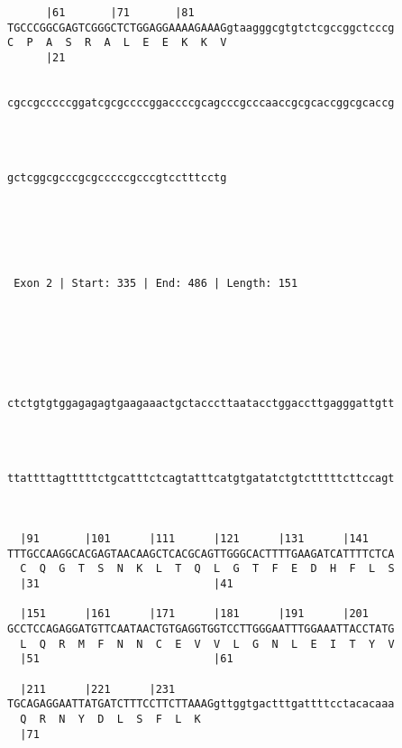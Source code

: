\documentclass{article}
\begin{document}
\begin{Verbatim}
      |61       |71       |81                               
TGCCCGGCGAGTCGGGCTCTGGAGGAAAAGAAAGgtaagggcgtgtctcgccggctcccg
C  P  A  S  R  A  L  E  E  K  K  V                          
      |21                                                   
   
                                                            
cgccgcccccggatcgcgccccggaccccgcagcccgcccaaccgcgcaccggcgcaccg
                                                            
                                                            
   
                                  
gctcggcgcccgcgcccccgcccgtcctttcctg
                                  
                                  
  



 Exon 2 | Start: 335 | End: 486 | Length: 151 





   
                                                            
ctctgtgtggagagagtgaagaaactgctacccttaatacctggaccttgagggattgtt
                                                            
                                                            
   
                                                            
ttattttagtttttctgcatttctcagtatttcatgtgatatctgtctttttcttccagt
                                                            
                                                            
   
  |91       |101      |111      |121      |131      |141    
TTTGCCAAGGCACGAGTAACAAGCTCACGCAGTTGGGCACTTTTGAAGATCATTTTCTCA
  C  Q  G  T  S  N  K  L  T  Q  L  G  T  F  E  D  H  F  L  S
  |31                           |41                         
   
  |151      |161      |171      |181      |191      |201    
GCCTCCAGAGGATGTTCAATAACTGTGAGGTGGTCCTTGGGAATTTGGAAATTACCTATG
  L  Q  R  M  F  N  N  C  E  V  V  L  G  N  L  E  I  T  Y  V
  |51                           |61                         
   
  |211      |221      |231                                  
TGCAGAGGAATTATGATCTTTCCTTCTTAAAGgttggtgactttgattttcctacacaaa
  Q  R  N  Y  D  L  S  F  L  K                              
  |71                                                       
   

\end{Verbatim}
\end{document}
